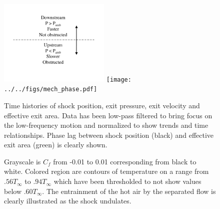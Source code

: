 \documentclass[]{aiaa-tc}%
\begin{document}
\begin{figure}[!h]%
	\begin{center}
	\includegraphics[trim = 3in 0in 2in 0in, clip,width=2.085in]{figs/phase_key.pdf}
	\texttt{[image: ../../figs/mech\_phase.pdf]}
	\end{center}
 	\caption{Time histories of shock position, exit pressure, exit velocity and effective exit area.  Data has been low-pass filtered to bring focus on the low-frequency motion and normalized to show trends and time relationships.  Phase lag between shock position (black) and effective exit area (green) is clearly shown.   }
 	\label{fig:phase}
\end{figure}



\begin{figure}
  \centering
  
  \hspace{0.1in}	            
  \hspace{0.1in}	
  
  
  \hspace{0.1in}	            
  \hspace{0.1in}	
  
  
  \hspace{0.1in}	            
  \hspace{0.1in}	
  
  \caption{Grayscale is $C_f$ from -0.01 to 0.01 corresponding from black to white.  Colored region are contours of temperature on a range from $.56T_{\infty}$ to $.94T_{\infty}$ which have been thresholded to not show values below $.60T_{\infty}$.  The entrainment of the hot air by the separated flow is clearly illustrated as the shock undulates.  }
  
  \label{fig:whistory}
\end{figure}
\end{document}
